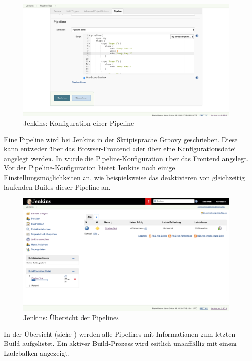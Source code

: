 \begin{figure}[h]
  \caption{Jenkins: Konfiguration einer Pipeline}
  \label{fig:jenkins-pipeline-config}
  \includegraphics[width=.8\textwidth]{assets/jenkins-pipeline-script}
\end{figure}

Eine Pipeline wird bei Jenkins in der Skriptsprache Groovy geschrieben. Diese kann entweder über das Browser-Frontend oder über eine Konfigurationsdatei angelegt werden. In  wurde die Pipeline-Konfiguration über das Frontend angelegt. Vor der Pipeline-Konfiguration bietet Jenkins noch einige Einstellungsmöglichkeiten an, wie beispielsweise das deaktivieren von gleichzeitig laufenden Builds dieser Pipeline an.

\begin{figure}[h]
  \caption{Jenkins: Übersicht der Pipelines}
  \label{fig:jenkins-pipeline-overview}
  \includegraphics[width=.8\textwidth]{assets/jenkins-pipeline-overview}
\end{figure}

In der Übersicht (siehe ) werden alle Pipelines mit Informationen zum letzten Build aufgelistet. Ein aktiver Build-Prozess wird seitlich unauffällig mit einem Ladebalken angezeigt.


